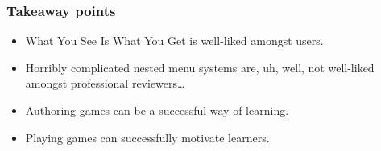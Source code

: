 \subsubsection{Takeaway points}

\begin{itemize}
\item What You See Is What You Get is well-liked amongst users.
\item Horribly complicated nested menu systems are, uh, well, not well-liked 
    amongst professional reviewers\ldots
\item Authoring games can be a successful way of learning.
\item Playing games can successfully motivate learners.
\end{itemize}

